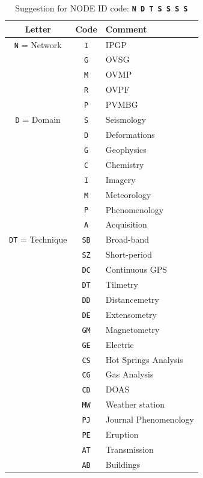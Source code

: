 \begin{table}
\caption{Suggestion for NODE ID code: \texttt{\textbf{N D T S S S S}}}
\begin{center}
\begin{tabular}{|c|c|l|}
\hline
\textbf{Letter} & \textbf{Code} & \textbf{Comment}\\
\hline
\texttt{N} = Network         & \texttt{I}	&	IPGP\\
      			             & \texttt{G}	&	OVSG\\
      			             & \texttt{M}	&	OVMP\\
      			             & \texttt{R}	&	OVPF\\
      			             & \texttt{P}	&	PVMBG\\
\hline
\texttt{D} = Domain          & \texttt{S}	&	Seismology\\
      			             & \texttt{D}	&	Deformations\\
      			             & \texttt{G}	&	Geophysics\\
      			             & \texttt{C}	&	Chemistry\\
      			             & \texttt{I}	&	Imagery\\
      			             & \texttt{M}	&	Meteorology\\
      			             & \texttt{P}	&	Phenomenology\\
      			             & \texttt{A}	&	Acquisition\\
\hline
\texttt{DT} = Technique      & \texttt{SB}	&	Broad-band\\
      			             & \texttt{SZ}	&	Short-period\\
      			             & \texttt{DC}	&	Continuous GPS\\
      			             & \texttt{DT}	&	Tilmetry\\
      			             & \texttt{DD}	&	Distancemetry\\
      			             & \texttt{DE}	&	Extensometry\\
      			             & \texttt{GM}	&	Magnetometry\\
      			             & \texttt{GE}	&	Electric\\
      			             & \texttt{CS}	&	Hot Springs Analysis\\
      			             & \texttt{CG}	&	Gas Analysis\\
      			             & \texttt{CD}	&	DOAS\\
      			             & \texttt{MW}	&	Weather station\\
      			             & \texttt{PJ}	&	Journal Phenomenology\\
      			             & \texttt{PE}	&	Eruption\\
      			             & \texttt{AT}	&	Transmission\\
      			             & \texttt{AB}	&	Buildings\\
\hline
\end{tabular}
\end{center}
\label{nodeidcodes}
\end{table}
